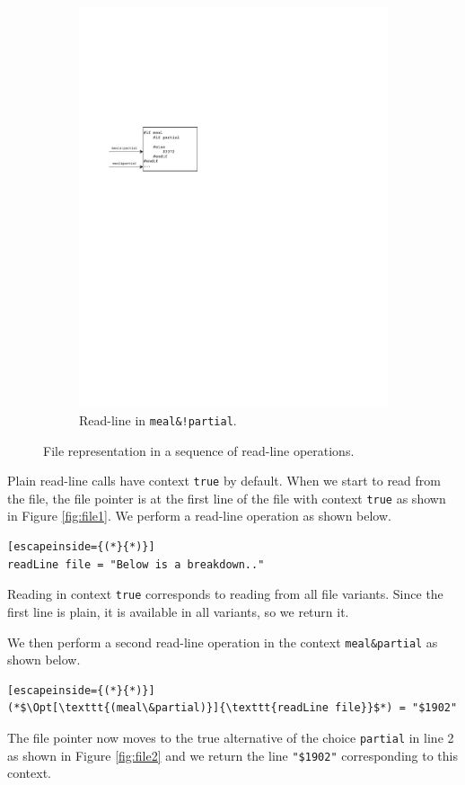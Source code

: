 \begin{figure}[!htb]
\begin{subfigure}[b]{.33\textwidth}
  \includegraphics[scale=0.75]{figures/vfile-Page-3.pdf}
  \caption{Read-line in \texttt{meal\&!partial}.}
  \label{fig:file3}
\end{subfigure}
  \caption{File representation in a sequence of read-line operations.}
  \label{fig:file-figures}
\end{figure}
%

Plain read-line calls have context \texttt{true} by default. When we start to read from the file, the file pointer is at the first line of the file with context \texttt{true} as shown in Figure \ref{fig:file1}. We perform a read-line operation as shown below.
%
\begin{lstlisting}[escapeinside={(*}{*)}]
readLine file = "Below is a breakdown.." 
\end{lstlisting}
%
Reading in context \texttt{true} corresponds to reading from all file variants. Since the first line is plain, it is available in all variants, so we return it. 

We then perform a second read-line operation in the context \texttt{meal\&partial} as shown below.
%
\begin{lstlisting}[escapeinside={(*}{*)}]
(*$\Opt[\texttt{(meal\&partial)}]{\texttt{readLine file}}$*) = "$1902"
\end{lstlisting}
%
The file pointer now moves to the true alternative of the choice \texttt{partial} in line 2 as shown in Figure \ref{fig:file2} and we return the line \texttt{"\$1902"} corresponding to this context. 
%

